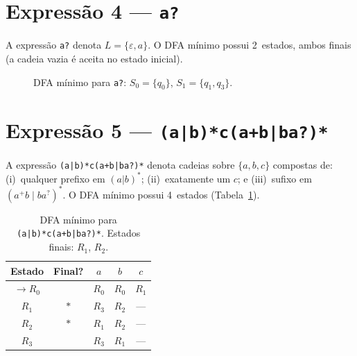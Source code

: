 \documentclass[sumario=abnt-6027-2012]{ifes8}
\newcommand{\rx}[1]{\texttt{#1}}
\begin{document}
\section{Expressão 4 --- \rx{a?}}

A expressão \rx{a?} denota $L = \{\varepsilon, a\}$. O DFA mínimo possui
2~estados, ambos finais (a cadeia vazia é aceita no estado inicial).

\begin{figure}[H]
  \centering
  \caption{DFA mínimo para \rx{a?}: $S_0 = \{q_0\}$, $S_1 = \{q_1,q_3\}$.}
  \label{fig:dfa-regex4}
\end{figure}

\section{Expressão 5 --- \rx{(a|b)*c(a+b|ba?)*}}

A expressão \rx{(a|b)*c(a+b|ba?)*} denota cadeias sobre $\{a,b,c\}$
compostas de: (i)~qualquer prefixo em $(a|b)^*$; (ii)~exatamente um $c$;
e (iii)~sufixo em $(a^+b \mid ba^?)^*$. O DFA mínimo possui 4~estados
(Tabela~\ref{tab:regex5-trans}).

\begin{table}[H]
  \centering
  \caption{DFA mínimo para \rx{(a|b)*c(a+b|ba?)*}. Estados finais: $R_1$, $R_2$.}
  \label{tab:regex5-trans}
  \renewcommand{\arraystretch}{1.2}
  \begin{tabular}{ccccc}
    \toprule
    \textbf{Estado} & \textbf{Final?} & $a$ & $b$ & $c$ \\
    \midrule
    $\to R_0$ &     & $R_0$ & $R_0$ & $R_1$ \\
    $R_1$     & $*$ & $R_3$ & $R_2$ & ---   \\
    $R_2$     & $*$ & $R_1$ & $R_2$ & ---   \\
    $R_3$     &     & $R_3$ & $R_1$ & ---   \\
    \bottomrule
  \end{tabular}
\end{table}
\end{document}
